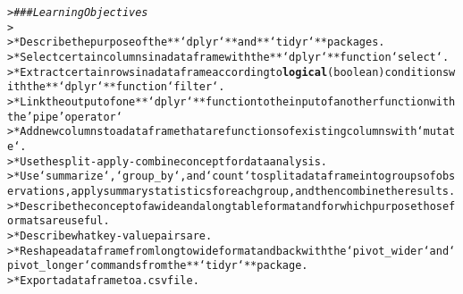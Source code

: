 \documentclass{article}\usepackage[]{graphicx}\usepackage[]{xcolor}
\makeatletter
\newcommand{\hlstr}[1]{\textcolor[rgb]{0.192,0.494,0.8}{#1}}%
\newcommand{\hlcom}[1]{\textcolor[rgb]{0.678,0.584,0.686}{\textit{#1}}}%
\newcommand{\hlkwd}[1]{\textcolor[rgb]{0.737,0.353,0.396}{\textbf{#1}}}%
\newenvironment{kframe}{%
 \def\at@end@of@kframe{}%
 \ifinner\ifhmode%
  \def\at@end@of@kframe{\end{minipage}}%
  \begin{minipage}{\columnwidth}%
 \fi\fi%
 \def\FrameCommand##1{\hskip\@totalleftmargin \hskip-\fboxsep
 \colorbox{shadecolor}{##1}\hskip-\fboxsep
     \hskip-\linewidth \hskip-\@totalleftmargin \hskip\columnwidth}%
 \MakeFramed {\advance\hsize-\width
   \@totalleftmargin\z@ \linewidth\hsize
   \@setminipage}}%
 {\par\unskip\endMakeFramed%
 \at@end@of@kframe}
\newenvironment{knitrout}{}{} %
\makeatother
\begin{document}
\begin{knitrout}
\color{fgcolor}\begin{kframe}
\begin{alltt}

> \hlcom{### Learning Objectives}
>
> * Describe the purpose of the **`dplyr`** and **`tidyr`** packages.
> * Select certain columns in a data frame with the **`dplyr`** function `select`.
> * Extract certain rows in a data frame according to \hlkwd{logical} (boolean) conditions with the **`dplyr`** function `filter` .
> * Link the output of one **`dplyr`** function to the input of another function with the \hlstr{'pipe'} operator `%>%`.
> * Add new columns to a data frame that are functions of existing columns with `mutate`.
> * Use the split-apply-combine concept for data analysis.
> * Use `summarize`, `group_by`, and `count` to split a data frame into groups of observations, apply summary statistics for each group, and then combine the results.
> * Describe the concept of a wide and a long table format and for which purpose those formats are useful.
> * Describe what key-value pairs are.
> * Reshape a data frame from long to wide format and back with the `pivot_wider` and `pivot_longer` commands from the **`tidyr`** package.
> * Export a data frame to a .csv file.
\end{alltt}


{\ttfamily\noindent\bfseries{}}\end{kframe}
\end{knitrout}
\end{document}
